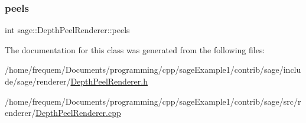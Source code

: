 \mbox{\label{classsage_1_1DepthPeelRenderer_a4ffb28eb6faffc06f3ef8cb3c6882484}} 
\subsubsection{\texorpdfstring{peels}{peels}}
{\footnotesize\ttfamily int sage\+::\+Depth\+Peel\+Renderer\+::peels\hspace{0.3cm}{\ttfamily [protected]}}



The documentation for this class was generated from the following files\+:\begin{DoxyCompactItemize}
\item 
/home/frequem/\+Documents/programming/cpp/sage\+Example1/contrib/sage/include/sage/renderer/\mbox{\hyperlink{DepthPeelRenderer_8h}{Depth\+Peel\+Renderer.\+h}}\item 
/home/frequem/\+Documents/programming/cpp/sage\+Example1/contrib/sage/src/renderer/\mbox{\hyperlink{DepthPeelRenderer_8cpp}{Depth\+Peel\+Renderer.\+cpp}}\end{DoxyCompactItemize}
